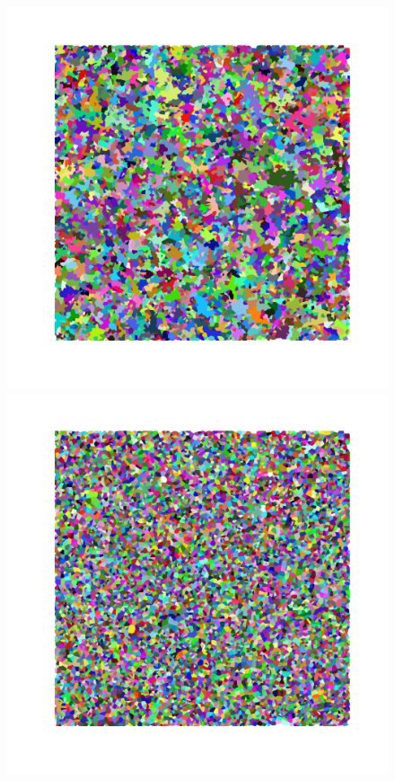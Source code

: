 \documentclass[reprint,amsmath,amssymb,aps,floatfix]{revtex4-1}
\begin{document}
\begin{figure}[!b]
  	\break
  	\includegraphics[scale=0.08]{avalanche_image_size1000000_seed5050_r5pt0.png}
  	\includegraphics[scale=0.08]{avalanche_image_size1000000_seed50050_r50pt0.png}
  	\label{fig:avalanches}
\end{figure}
\end{document}
